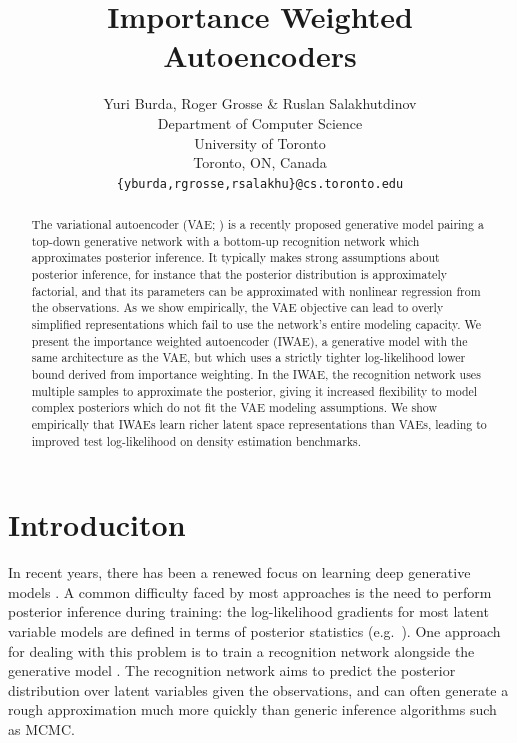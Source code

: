 \documentclass{article} %
\title{Importance Weighted Autoencoders}
\author{
Yuri Burda, Roger Grosse \& Ruslan Salakhutdinov \\
Department of Computer Science\\
University of Toronto\\
Toronto, ON, Canada \\
\texttt{\{yburda,rgrosse,rsalakhu\}@cs.toronto.edu}
}
\begin{document}
\maketitle

\begin{abstract}
The variational autoencoder (VAE; \cite{vae}) is a recently proposed generative model pairing a top-down generative network with a bottom-up recognition network which approximates posterior inference. It typically makes strong assumptions about posterior inference, for instance that the posterior distribution is approximately factorial, and that its parameters can be approximated with nonlinear regression from the observations. As we show empirically, the VAE objective can lead to overly simplified representations which fail to use the network's entire modeling capacity. We present the importance weighted autoencoder (IWAE), a generative model with the same architecture as the VAE, but which uses a strictly tighter log-likelihood lower bound derived from importance weighting. In the IWAE, the recognition network uses multiple samples to approximate the posterior, giving it increased flexibility to model complex posteriors which do not fit the VAE modeling assumptions. We show empirically that IWAEs learn richer latent space representations than VAEs, leading to improved test log-likelihood on density estimation benchmarks. 
\end{abstract}

\section{Introduciton}

In recent years, there has been a renewed focus on learning deep generative models \citep{greedy-dbn,dbm,DARN,vae,vae2}.
A common difficulty faced by most approaches is the need to perform posterior inference during training: the log-likelihood gradients for most latent variable models are defined in terms of posterior statistics (e.g.~\citet{dbm,deep-sigmoid,DARN}). One approach for dealing with this problem is to train a recognition network alongside the generative model \citep{helmholtz_machine}. The recognition network aims to predict the posterior distribution over latent variables given the observations, and can often generate a rough approximation much more quickly than generic inference algorithms such as MCMC. 
\end{document}
